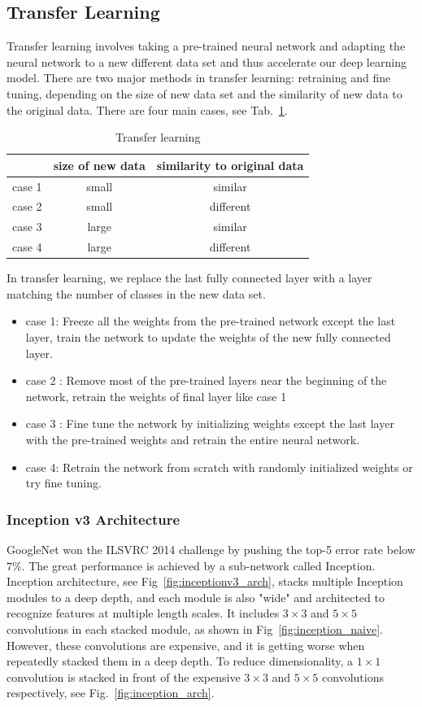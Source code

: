 \documentclass[11pt,oneside,a4paper]{article}
\begin{document}
\subsection{Transfer Learning}
Transfer learning involves taking a pre-trained neural network and adapting the neural network to a new different data set and thus accelerate our deep learning model. There are two major methods in transfer learning: retraining and fine tuning, depending on the size of new data set and the similarity of new data to the original data. There are four main cases, see Tab.~\ref{tab:transfer}.
\begin{table}[ht]
\begin{tabular}{l|c|c}
\hline
\hline
& size of new data & similarity to original data \\\hline
case 1 & small & similar \\
case 2 & small & different \\
case 3 & large & similar \\
case 4 & large & different \\\hline
\end{tabular}
\caption{Transfer learning}\label{tab:transfer}
\end{table}

In transfer learning, we replace the last fully connected layer with a layer matching the number of classes in the new data set. 
\begin{itemize}
\item case 1: Freeze all the weights from the pre-trained network except the last layer, train the network to update the weights of the new fully connected layer.
\item case 2 : Remove most of the pre-trained layers near the beginning of the network, retrain the weights of final layer like case 1
\item case 3 : Fine tune the network by initializing weights except the last layer with the pre-trained weights and retrain the entire neural network.
\item case 4: Retrain the network from scratch with randomly initialized weights or try fine tuning.
\end{itemize}

\subsubsection{Inception v3 Architecture}
GoogleNet won the ILSVRC 2014 challenge by pushing the top-5 error rate below $7\%$. The great performance is achieved by a sub-network called Inception. Inception architecture, see Fig~\ref{fig:inceptionv3_arch}, stacks multiple Inception modules to a deep depth, and each module is also "wide" and architected to recognize features at multiple length scales. It includes $3\times3$ and $5\times5$ convolutions in each stacked module, as shown in Fig~\ref{fig:inception_naive}. However, these convolutions are expensive, and it is getting worse when repeatedly stacked them in a deep depth. To reduce dimensionality, a $1\times1$ convolution is stacked in front of the expensive $3\times3$ and $5\times5$ convolutions respectively, see Fig.~\ref{fig:inception_arch}.
\end{document}
